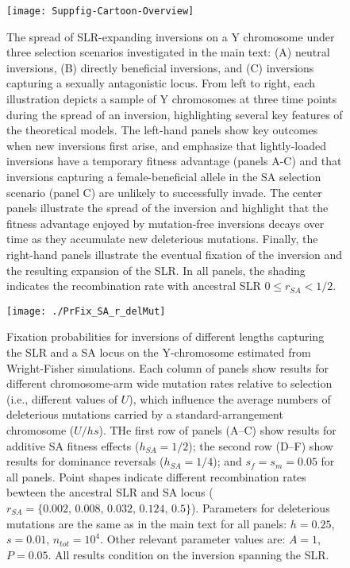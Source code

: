 \documentclass{article}
\begin{document}
\begin{appendices}
\begin{figure}[H]
 \centering
 \texttt{[image: Suppfig-Cartoon-Overview]}
 \caption{The spread of SLR-expanding inversions on a Y chromosome under three selection scenarios investigated in the main text: (A) neutral inversions, (B) directly beneficial inversions, and (C) inversions capturing a sexually antagonistic locus. From left to right, each illustration depicts a sample of Y chromosomes at three time points during the spread of an inversion, highlighting several key features of the theoretical models. The left-hand panels show key outcomes when new inversions first arise, and emphasize that lightly-loaded inversions have a temporary fitness advantage (panels A-C) and that inversions capturing a female-beneficial allele in the SA selection scenario (panel C) are unlikely to successfully invade. The center panels illustrate the spread of the inversion and highlight that the fitness advantage enjoyed by mutation-free inversions decays over time as they accumulate new deleterious mutations. Finally, the right-hand panels illustrate the eventual fixation of the inversion and the resulting expansion of the SLR. In all panels, the shading indicates the recombination rate with ancestral SLR $0 \leq r_{SA} < 1/2$.}
 \label{fig:diagramFig}
 \end{figure}



\newpage
 \begin{figure}[H]
 \centering
 \texttt{[image: ./PrFix\_SA\_r\_delMut]}
 \caption{Fixation probabilities for inversions of different lengths capturing the SLR and a SA locus on the Y-chromosome estimated from Wright-Fisher simulations. Each column of panels show results for different chromosome-arm wide mutation rates relative to selection (i.e., different values of $U$), which influence the average numbers of deleterious mutations carried by a standard-arrangement chromosome ($U/hs$). THe first row of panels (A--C) show results for additive SA fitness effects ($h_{SA} = 1/2$); the second row (D--F) show results for dominance reversals ($h_{SA} = 1/4$); and $s_f = s_m = 0.05$ for all panels. Point shapes indicate different recombination rates bewteen the ancestral SLR and SA locus ($r_{SA} = \{0.002,\, 0.008,\,0.032,\,0.124,\,0.5\}$). Parameters for deleterious mutations are the same as in the main text for all panels: $h = 0.25$, $s = 0.01$, $n_{tot} = 10^4$. Other relevant parameter values are: $A = 1$, $P = 0.05$. All results condition on the inversion spanning the SLR.}
 \label{fig:PrFixFig_SA_r}
 \end{figure}



\end{appendices}
\end{document}
